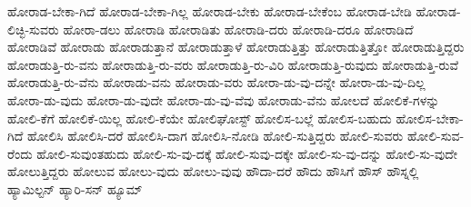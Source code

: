 {ಹೋರಾಡ-ಬೇಕಾ-ಗಿದೆ
ಹೋರಾಡ-ಬೇಕಾ-ಗಿಲ್ಲ
ಹೋರಾಡ-ಬೇಕು
ಹೋರಾಡ-ಬೇಕೆಂಬ
ಹೋರಾಡ-ಬೇಡಿ
ಹೋರಾಡ-ಲಿಚ್ಛಿ-ಸುವರು
ಹೋರಾ-ಡಲು
ಹೋರಾಡಿ
ಹೋರಾಡಿತು
ಹೋರಾಡಿ-ದರು
ಹೋರಾಡಿ-ದರೂ
ಹೋರಾಡಿದೆ
ಹೋರಾಡಿವೆ
ಹೋರಾಡು
ಹೋರಾಡುತ್ತಾನೆ
ಹೋರಾಡುತ್ತಾಳೆ
ಹೋರಾಡುತ್ತಿತ್ತು
ಹೋರಾಡುತ್ತಿತ್ತೋ
ಹೋರಾಡುತ್ತಿದ್ದರು
ಹೋರಾಡುತ್ತಿ-ರು-ವನು
ಹೋರಾಡುತ್ತಿ-ರು-ವರು
ಹೋರಾಡುತ್ತಿ-ರು-ವಿರಿ
ಹೋರಾಡುತ್ತಿ-ರುವುದು
ಹೋರಾಡುತ್ತಿ-ರುವೆ
ಹೋರಾಡುತ್ತಿ-ರು-ವೆನು
ಹೋರಾಡು-ವನು
ಹೋರಾಡು-ವರು
ಹೋರಾ-ಡು-ವು-ದನ್ನೇ
ಹೋರಾ-ಡು-ವು-ದಿಲ್ಲ
ಹೋರಾ-ಡು-ವುದು
ಹೋರಾ-ಡು-ವುದೇ
ಹೋರಾ-ಡು-ವು-ವೆವು
ಹೋರಾಡು-ವೆನು
ಹೋಲದೆ
ಹೋಲಿಕೆ-ಗಳನ್ನು
ಹೋಲಿ-ಕೆಗೆ
ಹೋಲಿಕೆ-ಯಿಲ್ಲ
ಹೋಲಿ-ಕೆಯೇ
ಹೋಲಿಘೋಸ್ಟ್
ಹೋಲಿಸ-ಬಲ್ಲೆ
ಹೋಲಿಸ-ಬಹುದು
ಹೋಲಿಸ-ಬೇಕಾ-ಗಿದೆ
ಹೋಲಿಸಿ
ಹೋಲಿಸಿ-ದರೆ
ಹೋಲಿಸಿ-ದಾಗ
ಹೋಲಿಸಿ-ನೋಡಿ
ಹೋಲಿ-ಸುತ್ತಿದ್ದರು
ಹೋಲಿ-ಸುವರು
ಹೋಲಿ-ಸುವ-ರೆಂದು
ಹೋಲಿ-ಸುವುಂತಹುದು
ಹೋಲಿ-ಸು-ವು-ದಕ್ಕೆ
ಹೋಲಿ-ಸುವು-ದಕ್ಕೇ
ಹೋಲಿ-ಸು-ವು-ದನ್ನು
ಹೋಲಿ-ಸು-ವುದೇ
ಹೋಲುತ್ತಿದ್ದರು
ಹೋಲುವ
ಹೋಲು-ವುದು
ಹೋಲು-ವುವು
ಹೌದಾ-ದರೆ
ಹೌದು
ಹೌಸಿಗೆ
ಹೌಸ್
ಹೌಸ್ನಲ್ಲಿ
ಹ್ಯಾಮಿಲ್ಟನ್
ಹ್ಯಾರಿ-ಸನ್
ಹ್ಯೂಮ್
}
